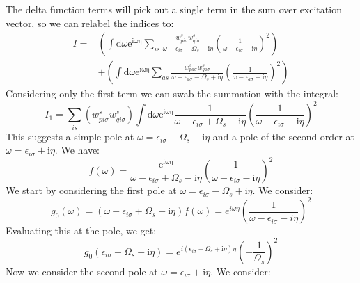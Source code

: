 \documentclass[12pt]{article}
\begin{document}
The delta function terms will pick out a single term in the sum over excitation vector, so we can relabel the indices to:
\begin{equation}
\begin{aligned}
I = & \left( \int \mathrm{d} \omega \mathrm{e}^{\mathrm{i \omega \eta}} \sum_{is} \frac{w_{p i \sigma}^s w_{q i \sigma}^s}{\omega-\epsilon_{i \sigma}+\Omega_s-\mathrm{i} \eta} \left(\frac{1}{\omega-\epsilon_{i \sigma}-\mathrm{i} \eta} \right)^2 \right)\\
& + \left( \int \mathrm{d} \omega \mathrm{e}^{\mathrm{i \omega \eta}} \sum_{as} \frac{w_{p a \sigma}^s w_{q a \sigma}^s}{\omega-\epsilon_{a \sigma}-\Omega_s+\mathrm{i} \eta} \left(\frac{1}{\omega-\epsilon_{a \sigma}+\mathrm{i} \eta} \right)^2 \right)
\end{aligned}
\end{equation}
Considering only the first term we can swab the summation with the integral:
\begin{equation}
I_1 = \sum_{is} \left( w_{p i \sigma}^s w_{q i \sigma}^s \right) \int \mathrm{d} \omega \mathrm{e}^{\mathrm{i \omega \eta}} \frac{1}{\omega-\epsilon_{i \sigma}+\Omega_s-\mathrm{i} \eta} \left(\frac{1}{\omega-\epsilon_{i \sigma}-\mathrm{i} \eta} \right)^2
\end{equation}
This suggests a simple pole at $\omega = \epsilon_{i \sigma} - \Omega_s + \mathrm{i} \eta$ and a pole of the second order at $\omega = \epsilon_{i \sigma} + \mathrm{i} \eta$. We have:
\begin{equation}
f(\omega) = \frac{\mathrm{e}^{\mathrm{i \omega \eta }}}{\omega-\epsilon_{i \sigma}+\Omega_s-\mathrm{i} \eta} \left(\frac{1}{\omega-\epsilon_{i \sigma}-\mathrm{i} \eta} \right)^2
\end{equation}
We start by considering the first pole at $\omega = \epsilon_{i \sigma} - \Omega_s + \mathrm{i} \eta$. We consider:
\begin{equation}
g_0(\omega) = \left( \omega - \epsilon_{i \sigma} + \Omega_s - \mathrm{i} \eta \right) f(\omega) = e^{i \omega \eta} \left( \frac{1}{\omega - \epsilon_{i \sigma} - i \eta} \right)^2
\end{equation}
Evaluating this at the pole, we get:
\begin{equation}
g_0(\epsilon_{i \sigma} - \Omega_s + \mathrm{i} \eta) = e^{i (\epsilon_{i \sigma} - \Omega_s + \mathrm{i} \eta) \eta} \left( -\frac{1}{\Omega_s} \right)^2
\end{equation}
Now we consider the second pole at $\omega = \epsilon_{i \sigma} + \mathrm{i} \eta$. We consider:
\end{document}
